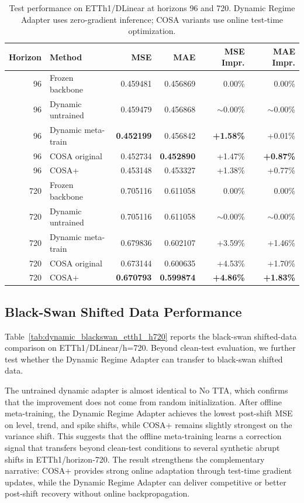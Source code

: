 \documentclass[10pt]{article}
\begin{document}
\begin{table}[!htbp]
\centering
\small
\caption{Test performance on ETTh1/DLinear at horizons 96 and 720. Dynamic Regime Adapter uses zero-gradient inference; COSA variants use online test-time optimization.}
\label{tab:etth1-clean}
\begin{tabular}{rlrrrr}
\toprule
Horizon & Method & MSE & MAE & MSE Impr. & MAE Impr. \\
\midrule
96 & Frozen backbone & 0.459481 & 0.456869 & 0.00\% & 0.00\% \\
96 & Dynamic untrained & 0.459479 & 0.456868 & $\sim$0.00\% & $\sim$0.00\% \\
96 & Dynamic meta-train & \textbf{0.452199} & 0.456842 & \textbf{+1.58\%} & +0.01\% \\
96 & COSA original & 0.452734 & \textbf{0.452890} & +1.47\% & \textbf{+0.87\%} \\
96 & COSA+ & 0.453148 & 0.453327 & +1.38\% & +0.77\% \\
720 & Frozen backbone & 0.705116 & 0.611058 & 0.00\% & 0.00\% \\
720 & Dynamic untrained & 0.705116 & 0.611058 & $\sim$0.00\% & $\sim$0.00\% \\
720 & Dynamic meta-train & 0.679836 & 0.602107 & +3.59\% & +1.46\% \\
720 & COSA original & 0.673144 & 0.600635 & +4.53\% & +1.70\% \\
720 & COSA+ & \textbf{0.670793} & \textbf{0.599874} & \textbf{+4.86\%} & \textbf{+1.83\%} \\
\bottomrule
\end{tabular}
\end{table}

\FloatBarrier
\subsection{Black-Swan Shifted Data Performance}
Table~\ref{tab:dynamic_blackswan_etth1_h720} reports the black-swan shifted-data comparison on ETTh1/DLinear/h=720. Beyond clean-test evaluation, we further test whether the Dynamic Regime Adapter can transfer to black-swan shifted data.

The untrained dynamic adapter is almost identical to No TTA, which confirms that the improvement does not come from random initialization. After offline meta-training, the Dynamic Regime Adapter achieves the lowest post-shift MSE on level, trend, and spike shifts, while COSA+ remains slightly strongest on the variance shift. This suggests that the offline meta-training learns a correction signal that transfers beyond clean-test conditions to several synthetic abrupt shifts in ETTh1/horizon-720. The result strengthens the complementary narrative: COSA+ provides strong online adaptation through test-time gradient updates, while the Dynamic Regime Adapter can deliver competitive or better post-shift recovery without online backpropagation.
\end{document}
